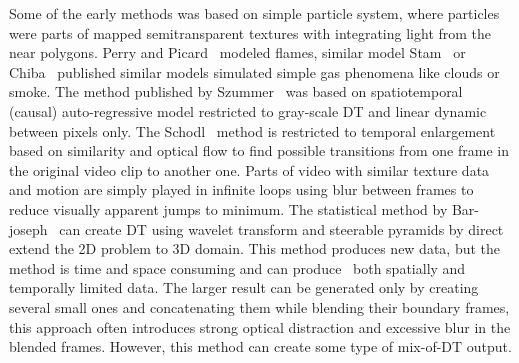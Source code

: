 \documentclass{\adsty/acmsiggraph}
\begin{document}
Some of the early methods was based on simple particle system, where particles were parts of mapped semitransparent textures with integrating light from the near polygons. Perry and Picard~\cite{Perry94synthesizingflames} modeled flames, similar model Stam~\cite{Stam93turbulentgas,chiba94vissimulation} or Chiba~\cite{chiba94vissimulation} published similar models simulated simple gas phenomena like clouds or smoke. The  method published by Szummer~\cite{Szummer96} was based on spatiotemporal (causal) auto-regressive model  restricted to  gray-scale DT and
linear dynamic between pixels only.  
 The Schodl~\cite{Schodl00videotextures} method is restricted to  temporal enlargement based on 
 similarity and optical flow to find   possible transitions from one frame in the original video clip to another one.  Parts of video with similar texture data and motion are simply played in infinite loops using blur between frames to reduce visually apparent jumps to minimum. 
 The statistical method by Bar-joseph~\cite{Bar-joseph01texturemixing,Bar-Joseph99statisticallearning}  can create DT  using  wavelet transform and steerable pyramids by direct extend the 2D problem to 3D domain. This method produces new data, but the method is time and space consuming and can produce~\cite{Bar-joseph01texturemixing} both spatially and temporally limited data. The larger result can be generated only by creating several small ones and concatenating them while blending their boundary frames, this approach often introduces strong optical distraction and excessive blur in the blended frames.   However, this method  can create some type of mix-of-DT output. 
\end{document}
